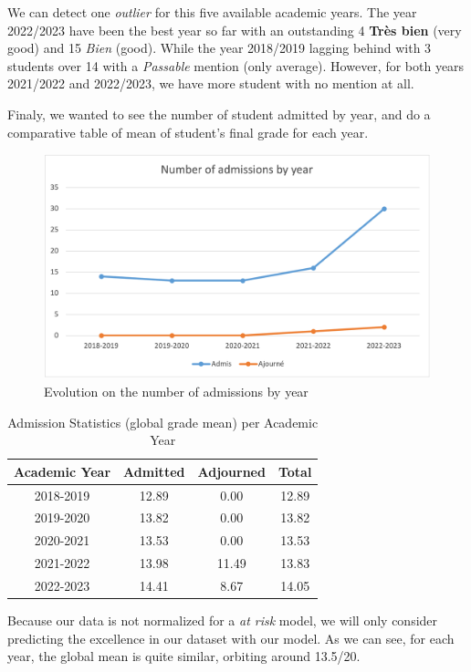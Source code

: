 \documentclass[../main.tex]{subfiles}
\begin{document}
We can detect one \textit{outlier} for this five available academic years. The year 2022/2023 have been the best year so far with an outstanding 4 \textbf{Très bien} (very good) and 15 \textit{Bien} (good). While the year 2018/2019 lagging behind with 3 students over 14 with a \textit{Passable} mention (only average). However, for both years 2021/2022 and 2022/2023, we have more student with no mention at all.

Finaly, we wanted to see the number of student admitted by year, and do a comparative table of mean of student's final grade for each year. 
\begin{figure}      
    \includegraphics[width=1\linewidth]{res/graph/data_analysis/raw/nbadmissions_year.png}
    \caption{Evolution on the number of admissions by year}
    \label{fig:evol_nb_admis}
\end{figure}
\begin{table}
  \centering
  \caption{Admission Statistics (global grade mean) per Academic Year}
  \begin{tabular}{|c|c|c|c|}
    \hline
    Academic Year & Admitted & Adjourned & Total \\
    \hline
    2018-2019 & 12.89 & 0.00 & 12.89 \\
    2019-2020 & 13.82 & 0.00 & 13.82 \\
    2020-2021 & 13.53 & 0.00 & 13.53 \\
    2021-2022 & 13.98 & 11.49 & 13.83 \\
    2022-2023 & 14.41 & 8.67 & 14.05 \\
    \hline
  \end{tabular}
  
  \label{tab:admission_statistics}
\end{table}

Because our data is not normalized for a \textit{at risk} model, we will only consider predicting the excellence in our dataset with our model.
As we can see, for each year, the global mean is quite similar, orbiting around 13.5/20.
\end{document}
